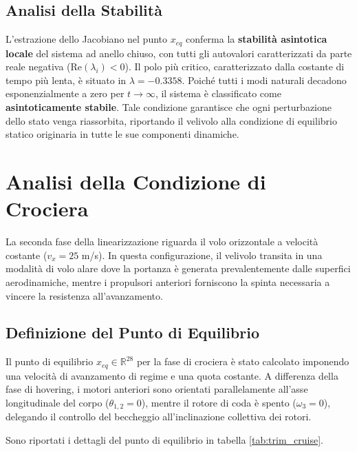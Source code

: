 \subsection{Analisi della Stabilità}
L'estrazione dello Jacobiano nel punto $x_{eq}$ conferma la \textbf{stabilità asintotica locale} del sistema ad anello chiuso, con tutti gli autovalori caratterizzati da parte reale negativa ($\text{Re}(\lambda_i) < 0$). 
Il polo più critico, caratterizzato dalla costante di tempo più lenta, è situato in $\lambda = -0.3358$. Poiché tutti i modi naturali decadono esponenzialmente a zero per $t \to \infty$, il sistema è classificato come \textbf{asintoticamente stabile}. Tale condizione garantisce che ogni perturbazione dello stato venga riassorbita, riportando il velivolo alla condizione di equilibrio statico originaria in tutte le sue componenti dinamiche.
\clearpage


\section{Analisi della Condizione di Crociera}
La seconda fase della linearizzazione riguarda il volo orizzontale a velocità costante ($v_x = 25$ m/s). In questa configurazione, il velivolo transita in una modalità di volo alare dove la portanza è generata prevalentemente dalle superfici aerodinamiche, mentre i propulsori anteriori forniscono la spinta necessaria a vincere la resistenza all'avanzamento.

\subsection{Definizione del Punto di Equilibrio}
Il punto di equilibrio $x_{eq} \in \mathbb{R}^{28}$ per la fase di crociera è stato calcolato imponendo una velocità di avanzamento di regime e una quota costante. A differenza della fase di hovering, i motori anteriori sono orientati parallelamente all'asse longitudinale del corpo ($\theta_{1,2} = 0$), mentre il rotore di coda è spento ($\omega_3 = 0$), delegando il controllo del beccheggio all'inclinazione collettiva dei rotori.

Sono riportati i dettagli del punto di equilibrio in tabella \ref{tab:trim_cruise}.

